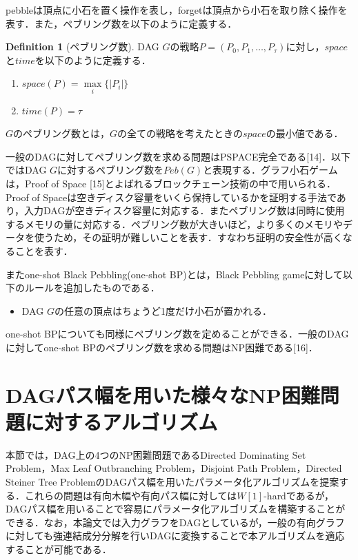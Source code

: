 \documentclass[master]{kuisthesis}		%
\theoremstyle{plain}
\theoremstyle{definition}
\newtheorem{definition*}{Definition}
\begin{document}
pebbleは頂点に小石を置く操作を表し，forgetは頂点から小石を取り除く操作を表す．また，ペブリング数を以下のように定義する．

\begin{definition*}[ペブリング数]
    DAG $G$の戦略$P = (P_0, P_1,   \dots, P_{\tau})$に対し，$space$と$time$を以下のように定義する．

    \begin{enumerate}
        \item $space(P) =  \underset{i}{\max} \{ |P_i| \}$
        \item $time(P) = \tau$
    \end{enumerate}

    $G$のペブリング数とは，$G$の全ての戦略を考えたときの$space$の最小値である．

\end{definition*}

一般のDAGに対してペブリング数を求める問題はPSPACE完全である[14]．以下ではDAG $G$に対するペブリング数を$Peb(G)$と表現する．グラフ小石ゲームは，Proof of Space [15]とよばれるブロックチェーン技術の中で用いられる．Proof of Spaceは空きディスク容量をいくら保持しているかを証明する手法であり，入力DAGが空きディスク容量に対応する．またペブリング数は同時に使用するメモリの量に対応する．ペブリング数が大きいほど，より多くのメモリやデータを使うため，その証明が難しいことを表す．すなわち証明の安全性が高くなることを表す．

またone-shot Black Pebbling(one-shot BP)とは，Black Pebbling gameに対して以下のルールを追加したものである．
\begin{itemize}
    \item DAG $G$の任意の頂点はちょうど1度だけ小石が置かれる．
\end{itemize}

one-shot BPについても同様にペブリング数を定めることができる．一般のDAGに対してone-shot BPのペブリング数を求める問題はNP困難である[16]．




















\section{DAGパス幅を用いた様々なNP困難問題に対するアルゴリズム} %
本節では，DAG上の4つのNP困難問題であるDirected Dominating Set Problem，Max Leaf Outbranching Problem，Disjoint Path Problem，Directed Steiner Tree ProblemのDAGパス幅を用いたパラメータ化アルゴリズムを提案する．これらの問題は有向木幅や有向パス幅に対しては$W[1]$-hardであるが，DAGパス幅を用いることで容易にパラメータ化アルゴリズムを構築することができる．なお，本論文では入力グラフをDAGとしているが，一般の有向グラフに対しても強連結成分分解を行いDAGに変換することで本アルゴリズムを適応することが可能である．
\end{document}
